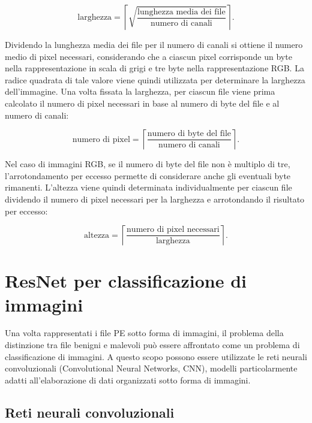\[
\text{larghezza} =
\left\lceil
\sqrt{
\frac{\text{lunghezza media dei file}}
     {\text{numero di canali}}
}
\right\rceil.
\]

\noindent Dividendo la lunghezza media dei file per il numero di canali si
ottiene il numero medio di pixel necessari, considerando che a ciascun
pixel corrisponde un byte nella rappresentazione in scala di grigi e
tre byte nella rappresentazione RGB. La radice quadrata di tale valore
viene quindi utilizzata per determinare la larghezza dell'immagine.
Una volta fissata la larghezza, per ciascun file viene prima calcolato
il numero di pixel necessari in base al numero di byte del file e al
numero di canali:

\[
\text{numero di pixel} =
\left\lceil
\frac{\text{numero di byte del file}}
     {\text{numero di canali}}
\right\rceil.
\]

\newpage

\noindent Nel caso di immagini RGB, se il numero di byte del file non è multiplo di tre,
l'arrotondamento per eccesso permette di considerare anche gli
eventuali byte rimanenti.
L'altezza viene quindi determinata individualmente per ciascun file dividendo il numero di pixel
necessari per la larghezza e arrotondando il risultato per eccesso:

\[
\text{altezza} =
\left\lceil
\frac{\text{numero di pixel necessari}}
     {\text{larghezza}}
\right\rceil.
\]

\section{ResNet per classificazione di immagini}

Una volta rappresentati i file PE sotto forma di immagini, il problema
della distinzione tra file benigni e malevoli può essere affrontato
come un problema di classificazione di immagini. A questo scopo
possono essere utilizzate le reti neurali convoluzionali
(Convolutional Neural Networks, CNN), modelli particolarmente adatti
all'elaborazione di dati organizzati sotto forma di immagini.

\subsection{Reti neurali convoluzionali}

